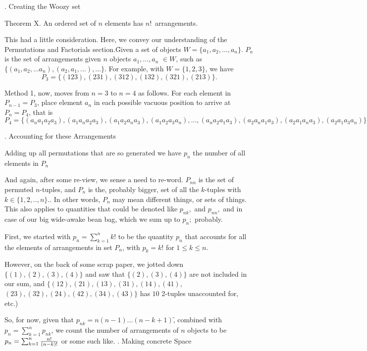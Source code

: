\eject

. Creating the Woozy set

\proclaim Theorem X. An ordered set of $n$ elements
has $n!$~arrangements.

This had a little consideration.  Here, we
convey our understanding of the Permutations and
Factorials section.\f

Given a set of objects $W=\{a_1,a_2,...,a_n\}$.
$P_n$ is the set of arrangements given $n$ objects
$a_1,...,a_n$ $\in W$, such as
$\{(a_1,a_2,...a_n),(a_2,a_1,...),...\}$. For example,
with $W=\{1,2,3\}$, we have
$$P_3=\{(123),(231),(312),(132),(321),(213)\}.$$

\e
Method 1, now, moves from $n=3$ to $n=4$ as follows.
For each element in $P_{n-1}=P_3$, place element
$a_n$ in each possible vacuous position to arrive at
$P_n=P_4$, that is
$$P_4=\{(a_na_1a_2a_3),
       (a_1a_na_2a_3),
       (a_1a_2a_na_3),
       (a_1a_2a_3a_n),
       ...,
       (a_na_2a_1a_3),
       (a_2a_na_1a_3),
       (a_2a_1a_na_3),
       (a_2a_1a_3a_n)\}$$

. Accounting for these Arrangements

\e
Adding up all permutations that are so generated we have
$p_n$ the number of all elements in $P_n$ %

\e
And again, after some re-view, we sense a need to re-word.
$P_{nn}$ is the set of permuted $n$-tuples, and $P_n$ is
the, probably bigger, set of all the $k$-tuples with
$k\in\{1,2,..,n\}.$. In other words, $P_n$
may mean different things, or sets of things. This also
applies to quantities that could be denoted like $p_{nk},$
and $p_{nn},$ and in case of our big wide-awake bean bag,
which we sum up to $p_n;$  probably.

\e
First, we started with $p_n=\sum_{k=1}^n k!$
to be the quantity
$p_n$ that accounts for all the elements of
arrangements in set $P_n$, 
with $p_k=k!$ for $1\le k\le n$.

However, on the back of some scrap paper, we jotted down
$\{(1),(2),(3),(4)\}$ and saw that $\{(2),(3),(4)\}$ are
not included in our sum, and
$\{(12),(21),(13),(31),(14),(41),$
$(23),(32),(24),(42),(34),(43)\}$ has $10$ 2-tuples unaccounted
for, etc.)

\e
So, for now, given that $p_{nk}=n(n-1)...(n-k+1)$\f,
combined with $p_n=\sum_{k=1}^n p_{nk}$,
we count the number of arrangements of $n$ objects to be
$p_n=\sum_{k=1}^n {n!\over{(n-k)!}}$
or some such like.
\eject
{}. Making concrete Space

